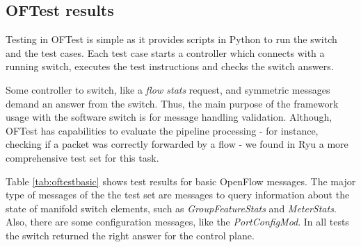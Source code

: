 \subsection{OFTest results}

Testing in OFTest is simple as it provides scripts in Python to run the switch and the test cases. Each test case starts a controller which connects with a running switch, executes the test instructions and checks the switch answers. 

Some controller to switch, like a \textit{flow stats} request, and symmetric messages demand an answer from the switch. Thus, the main purpose of the framework usage with the software switch is for message handling validation. Although, OFTest has capabilities to evaluate the pipeline processing - for instance, checking if a packet was correctly forwarded by a flow - we found in Ryu a more comprehensive test set for this task. 

Table \ref{tab:oftestbasic} shows test results for basic OpenFlow messages. The major type of messages of the the test set are messages to query information about the state of manifold switch elements, such as \textit{GroupFeatureStats} and \textit{MeterStats}. Also, there are some configuration messages, like the \textit{PortConfigMod}. In all tests the switch returned the right answer for the control plane.


